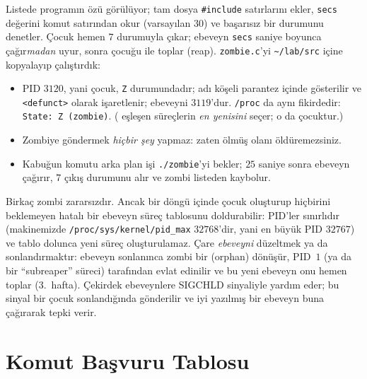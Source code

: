 

Listede programın özü görülüyor; tam dosya \texttt{\#include} satırlarını ekler, \texttt{secs} değerini komut satırından okur (varsayılan $30$) ve başarısız bir  durumunu denetler. Çocuk hemen $7$ durumuyla çıkar; ebeveyn \texttt{secs} saniye boyunca  çağır\emph{madan} uyur, sonra çocuğu  ile toplar (reap). \texttt{zombie.c}'yi \texttt{\textasciitilde/lab/src} içine kopyalayıp çalıştırdık:



\begin{itemize}
  \item PID $3120$, yani çocuk, \texttt{Z} durumundadır; adı köşeli parantez içinde gösterilir ve \texttt{<defunct>} olarak işaretlenir; ebeveyni $3119$'dur. \texttt{/proc} da aynı fikirdedir: \texttt{State: Z (zombie)}. ( eşleşen süreçlerin \emph{en yenisini} seçer; o da çocuktur.)
  \item Zombiye  göndermek \emph{hiçbir şey} yapmaz: zaten ölmüş olanı öldüremezsiniz.
  \item Kabuğun  komutu arka plan işi \texttt{./zombie}'yi bekler; $25$ saniye sonra ebeveyn  çağırır, $7$ çıkış durumunu alır ve zombi listeden kaybolur.
\end{itemize}

Birkaç zombi zararsızdır. Ancak bir döngü içinde çocuk oluşturup hiçbirini beklemeyen hatalı bir ebeveyn süreç tablosunu doldurabilir: PID'ler sınırlıdır (makinemizde \nolinkurl{/proc/sys/kernel/pid_max} $32768$'dir, yani en büyük PID $32767$) ve tablo dolunca yeni süreç oluşturulamaz. Çare \emph{ebeveyni} düzeltmek ya da sonlandırmaktır: ebeveyn sonlanınca zombi bir  (orphan) dönüşür, PID~$1$ (ya da bir ``subreaper'' süreci) tarafından evlat edinilir ve bu yeni ebeveyn onu hemen toplar (3.~hafta). Çekirdek ebeveynlere SIGCHLD sinyaliyle yardım eder; bu sinyal bir çocuk sonlandığında gönderilir ve iyi yazılmış bir ebeveyn buna  çağırarak tepki verir.

\section{Komut Başvuru Tablosu}

